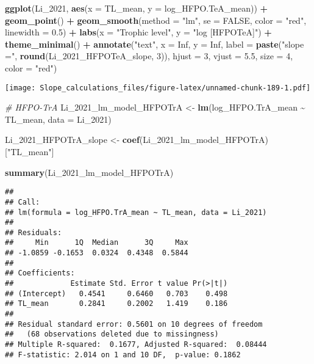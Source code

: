 \documentclass[
]{article}
\newenvironment{Shaded}{\begin{snugshade}}{\end{snugshade}}
\newcommand{\AttributeTok}[1]{\textcolor[rgb]{0.13,0.29,0.53}{#1}}
\newcommand{\CommentTok}[1]{\textcolor[rgb]{0.56,0.35,0.01}{\textit{#1}}}
\newcommand{\ConstantTok}[1]{\textcolor[rgb]{0.56,0.35,0.01}{#1}}
\newcommand{\DecValTok}[1]{\textcolor[rgb]{0.00,0.00,0.81}{#1}}
\newcommand{\FloatTok}[1]{\textcolor[rgb]{0.00,0.00,0.81}{#1}}
\newcommand{\FunctionTok}[1]{\textcolor[rgb]{0.13,0.29,0.53}{\textbf{#1}}}
\newcommand{\NormalTok}[1]{#1}
\newcommand{\OtherTok}[1]{\textcolor[rgb]{0.56,0.35,0.01}{#1}}
\newcommand{\SpecialCharTok}[1]{\textcolor[rgb]{0.81,0.36,0.00}{\textbf{#1}}}
\newcommand{\StringTok}[1]{\textcolor[rgb]{0.31,0.60,0.02}{#1}}
\begin{document}
\begin{Shaded}
\begin{Highlighting}[]
\FunctionTok{ggplot}\NormalTok{(Li\_2021, }\FunctionTok{aes}\NormalTok{(}\AttributeTok{x =}\NormalTok{ TL\_mean, }\AttributeTok{y =}\NormalTok{ log\_HFPO.TeA\_mean)) }\SpecialCharTok{+}
  \FunctionTok{geom\_point}\NormalTok{() }\SpecialCharTok{+}
  \FunctionTok{geom\_smooth}\NormalTok{(}\AttributeTok{method =} \StringTok{"lm"}\NormalTok{, }\AttributeTok{se =} \ConstantTok{FALSE}\NormalTok{, }\AttributeTok{color =} \StringTok{"red"}\NormalTok{, }\AttributeTok{linewidth =} \FloatTok{0.5}\NormalTok{) }\SpecialCharTok{+}
  \FunctionTok{labs}\NormalTok{(}\AttributeTok{x =} \StringTok{"Trophic level"}\NormalTok{,}
       \AttributeTok{y =} \StringTok{"log [HFPOTeA]"}\NormalTok{) }\SpecialCharTok{+}
  \FunctionTok{theme\_minimal}\NormalTok{() }\SpecialCharTok{+}
  \FunctionTok{annotate}\NormalTok{(}\StringTok{"text"}\NormalTok{, }\AttributeTok{x =} \ConstantTok{Inf}\NormalTok{, }\AttributeTok{y =} \ConstantTok{Inf}\NormalTok{, }\AttributeTok{label =} \FunctionTok{paste}\NormalTok{(}\StringTok{"slope ="}\NormalTok{, }\FunctionTok{round}\NormalTok{(Li\_2021\_HFPOTeA\_slope, }\DecValTok{3}\NormalTok{)), }
           \AttributeTok{hjust =} \DecValTok{3}\NormalTok{, }\AttributeTok{vjust =} \FloatTok{5.5}\NormalTok{, }\AttributeTok{size =} \DecValTok{4}\NormalTok{, }\AttributeTok{color =} \StringTok{"red"}\NormalTok{)}
\end{Highlighting}
\end{Shaded}

\texttt{[image: Slope\_calculations\_files/figure-latex/unnamed-chunk-189-1.pdf]}

\begin{Shaded}
\begin{Highlighting}[]
\CommentTok{\# HFPO{-}TrA}
\NormalTok{Li\_2021\_lm\_model\_HFPOTrA }\OtherTok{\textless{}{-}} \FunctionTok{lm}\NormalTok{(log\_HFPO.TrA\_mean }\SpecialCharTok{\textasciitilde{}}\NormalTok{ TL\_mean,}
                                    \AttributeTok{data =}\NormalTok{ Li\_2021)}

\NormalTok{Li\_2021\_HFPOTrA\_slope }\OtherTok{\textless{}{-}} \FunctionTok{coef}\NormalTok{(Li\_2021\_lm\_model\_HFPOTrA)[}\StringTok{"TL\_mean"}\NormalTok{]}

\FunctionTok{summary}\NormalTok{(Li\_2021\_lm\_model\_HFPOTrA)}
\end{Highlighting}
\end{Shaded}

\begin{verbatim}
## 
## Call:
## lm(formula = log_HFPO.TrA_mean ~ TL_mean, data = Li_2021)
## 
## Residuals:
##     Min      1Q  Median      3Q     Max 
## -1.0859 -0.1653  0.0324  0.4348  0.5844 
## 
## Coefficients:
##             Estimate Std. Error t value Pr(>|t|)
## (Intercept)   0.4541     0.6460   0.703    0.498
## TL_mean       0.2841     0.2002   1.419    0.186
## 
## Residual standard error: 0.5601 on 10 degrees of freedom
##   (68 observations deleted due to missingness)
## Multiple R-squared:  0.1677, Adjusted R-squared:  0.08444 
## F-statistic: 2.014 on 1 and 10 DF,  p-value: 0.1862
\end{verbatim}
\end{document}

